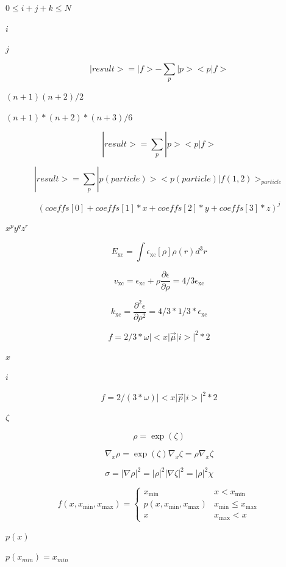 \documentclass{article}
\begin{document}
$0\le i+j+k\le N$
\pagebreak

$i$
\pagebreak

$j$
\pagebreak

\[
  |result> = |f> - \sum_p |p><p|f>
\]
\pagebreak

$(n+1)(n+2)/2$
\pagebreak

$(n+1)*(n+2)*(n+3)/6$
\pagebreak

\[
    | result > =  \sum_p | p > <p|f>
\]
\pagebreak

\[
|result> = \sum_p |p(particle)> <p(particle)|f(1,2)>_{particle}
\]
\pagebreak

\[ (coeffs[0] + coeffs[1]*x + coeffs[2]*y + coeffs[3]*z)^j \]
\pagebreak

$x^p y^q z^r$
\pagebreak

\[
   E_\mathrm{xc} = \int\epsilon_\mathrm{xc}[\rho]\rho(r) d^3r
\]
\pagebreak

\[
   v_\mathrm{xc} = \epsilon_\mathrm{xc} + \rho\frac{\partial \epsilon}{\partial \rho}
                 = 4/3\epsilon_\mathrm{xc}
\]
\pagebreak

\[
   k_\mathrm{xc} = \frac{\partial^2\epsilon}{\partial \rho^2} = 4/3*1/3 * \epsilon_\mathrm{xc}
\]
\pagebreak

\[
f = 2/3 * \omega |<x | \vec \mu | i >| ^2 * 2
\]
\pagebreak

$ x $
\pagebreak

$ i $
\pagebreak

\[
f = 2/(3 * \omega) |<x | \vec p | i >| ^2 * 2
\]
\pagebreak

$ \zeta $
\pagebreak

\[
\rho = \exp(\zeta)
\]
\pagebreak

\[
\nabla_x\rho = \exp(\zeta)\nabla_x\zeta = \rho \nabla_x\zeta
\]
\pagebreak

\[
  \sigma = |\nabla\rho|^2 = |\rho|^2 |\nabla\zeta|^2 = |\rho|^2 \chi
\]
\pagebreak

\[
f(x,x_{\mathrm{min}},x_{\mathrm{max}}) = \left\{
  \begin{array}{ll}
    x_{\mathrm{min}}                       & x < x_{\mathrm{min}} \\
    p(x,x_{\mathrm{min}},x_{\mathrm{max}}) & x_{\mathrm{min}} \leq x_{\mathrm{max}} \\
    x                                      & x_{\mathrm{max}} < x
  \end{array}
\right.
\]
\pagebreak

$p(x)$
\pagebreak

$p(x_{min})=x_{min}$
\pagebreak
\end{document}
